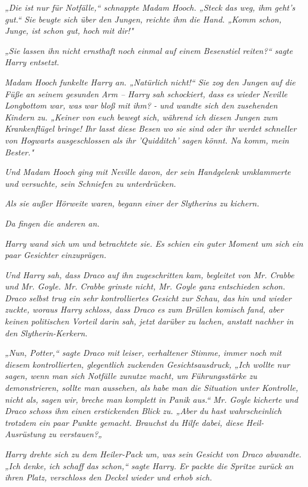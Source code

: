 {\emph{„Die ist nur für Notfälle,“ schnappte Madam Hooch. „Steck das weg, ihm geht's gut.“ Sie beugte sich über den Jungen, reichte ihm die Hand. „Komm schon, Junge, ist schon gut, hoch mit dir!"}

\emph{„Sie lassen ihn nicht ernsthaft noch einmal auf einem Besenstiel reiten?“ sagte Harry entsetzt.}

\emph{Madam Hooch funkelte Harry an. „Natürlich nicht!“ Sie zog den Jungen auf die Füße an seinem gesunden Arm -- Harry sah schockiert, dass es} \emph{\emph{wieder}} \emph{Neville Longbottom war, was} \emph{\emph{war}} \emph{bloß mit ihm? - und wandte sich den zusehenden Kindern zu. „Keiner von euch bewegt sich, während ich diesen Jungen zum Krankenflügel bringe! Ihr lasst diese Besen wo sie sind oder ihr werdet schneller von Hogwarts ausgeschlossen als ihr 'Quidditch' sagen könnt. Na komm, mein Bester."}

\emph{Und Madam Hooch ging mit Neville davon, der sein Handgelenk umklammerte und versuchte, sein Schniefen zu unterdrücken.}

\emph{Als sie außer Hörweite waren, begann einer der Slytherins zu kichern.}

\emph{Da fingen die anderen an.}

\emph{Harry wand sich um und betrachtete sie. Es schien ein guter Moment um sich ein paar Gesichter einzuprägen.}

\emph{Und Harry sah, dass Draco auf ihn zugeschritten kam, begleitet von Mr. Crabbe und Mr. Goyle. Mr. Crabbe grinste nicht, Mr. Goyle ganz entschieden schon. Draco selbst trug ein sehr kontrolliertes Gesicht zur Schau, das hin und wieder zuckte, woraus Harry schloss, dass Draco es zum Brüllen komisch fand, aber keinen politischen Vorteil darin sah, jetzt darüber zu lachen, anstatt nachher in den Slytherin-Kerkern.}

\emph{„Nun, Potter,“ sagte Draco mit leiser, verhaltener Stimme, immer noch mit diesem kontrollierten, glegentlich zuckenden Gesichtsausdruck, „Ich wollte nur sagen, wenn man sich Notfälle zunutze macht, um Führungsstärke zu demonstrieren, sollte man aussehen, als habe man die Situation unter Kontrolle, nicht als, sagen wir, breche man komplett in Panik aus.“ Mr. Goyle kicherte und Draco schoss ihm einen erstickenden Blick zu. „Aber du hast wahrscheinlich trotzdem ein paar Punkte gemacht. Brauchst du Hilfe dabei, diese Heil-Ausrüstung zu verstauen?„}

\emph{Harry drehte sich zu dem Heiler-Pack um, was sein Gesicht von Draco abwandte. „Ich denke, ich schaff das schon,“ sagte Harry. Er packte die Spritze zurück an ihren Platz, verschloss den Deckel wieder und erhob sich.}

}
